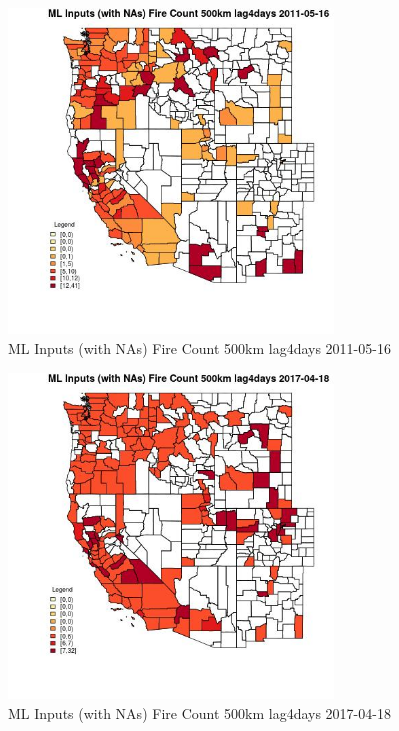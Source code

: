 \begin{figure} 
\centering  
\includegraphics[width=0.77\textwidth]{Code_Outputs/Report_ML_input_PM25_Step4_part_e_de_duplicated_aves_compiled_2019-05-21wNAs_CountyFire_Count_500km_lag4daysMean2011-05-16.jpg} 
\caption{\label{fig:Report_ML_input_PM25_Step4_part_e_de_duplicated_aves_compiled_2019-05-21wNAsCountyFire_Count_500km_lag4daysMean2011-05-16}ML Inputs (with NAs) Fire Count 500km lag4days 2011-05-16} 
\end{figure} 
 

\begin{figure} 
\centering  
\includegraphics[width=0.77\textwidth]{Code_Outputs/Report_ML_input_PM25_Step4_part_e_de_duplicated_aves_compiled_2019-05-21wNAs_CountyFire_Count_500km_lag4daysMean2017-04-18.jpg} 
\caption{\label{fig:Report_ML_input_PM25_Step4_part_e_de_duplicated_aves_compiled_2019-05-21wNAsCountyFire_Count_500km_lag4daysMean2017-04-18}ML Inputs (with NAs) Fire Count 500km lag4days 2017-04-18} 
\end{figure} 
 

